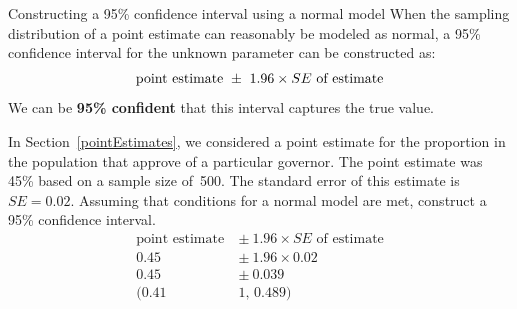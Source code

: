 \begin{onebox}{Constructing a 95\% confidence interval using a normal model}
When the sampling distribution of a point estimate can reasonably be modeled as normal, a 95\% confidence interval for the unknown parameter can be constructed as: \vspace{-2mm}
\begin{align*}
\text{point estimate}\ \pm\ 1.96 \times SE\text{ of estimate}\vspace{-2mm}
\end{align*}
We can be \textbf{95\% confident} that this interval captures the true value.\end{onebox}
\label{95PercentConfidenceIntervalFormula}

\begin{examplewrap}
\begin{nexample}{In Section~\ref{pointEstimates}, we considered a point estimate for the proportion in the population that approve of a particular governor.  The point estimate was 45\% based on a sample size of~500.
    The standard error of this estimate is $SE = 0.02$.
    Assuming that conditions for a normal model are met,
    construct a 95\% confidence interval.  }
\begin{align*}
\text{point estimate}\ &\pm \ 1.96\times SE \text{ of estimate} \\
0.45\  &\pm \ 1.96 \times 0.02\\
0.45\  &\pm \ 0.039\\
(0.41&1\text{, } 0.489)
\end{align*}
\label{governorci}
\end{nexample}
\end{examplewrap}




